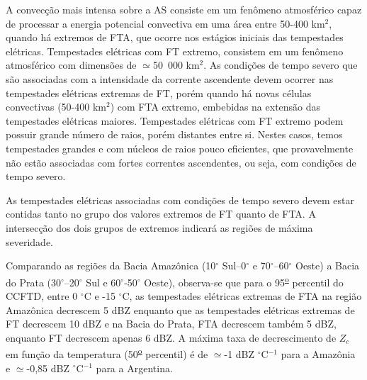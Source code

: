 
A convecção mais intensa sobre a AS consiste em um fenômeno atmosférico capaz de processar a energia potencial convectiva em uma área entre 50-400 km$^{2}$, quando há extremos de FTA, que ocorre nos estágios iniciais das tempestades elétricas. Tempestades elétricas com FT extremo, consistem em um fenômeno  atmosférico com dimensões de $\simeq$50~000 km$^{2}$. As condições de tempo severo que são associadas com a intensidade da corrente ascendente devem ocorrer nas tempestades elétricas extremas de FT, porém quando há novas células convectivas (50-400 km$^{2}$) com FTA extremo, embebidas na extensão das tempestades elétricas maiores. Tempestades elétricas com FT extremo podem possuir grande número de raios, porém distantes entre si. Nestes casos, temos tempestades grandes e com núcleos de raios pouco eficientes, que provavelmente não estão associadas com fortes correntes ascendentes, ou seja, com condições de tempo severo.


As tempestades elétricas associadas com condições de tempo severo devem estar contidas tanto no grupo dos valores extremos de FT quanto de FTA. A intersecção dos dois grupos de extremos indicará as regiões de máxima severidade. %

Comparando as regiões da Bacia Amazônica (10$^{\circ}$ Sul--0$^{\circ}$ e 70$^{\circ}$--60$^{\circ}$ Oeste) a Bacia do Prata (30$^{\circ}$--20$^{\circ}$ Sul e 60$^{\circ}$-50$^{\circ}$ Oeste), observa-se que para o 95\textsuperscript{\underline{o}} percentil do CCFTD, entre 0 $^{\circ}$C e -15 $^{\circ}$C, as tempestades elétricas extremas de FTA na região Amazônica decrescem 5 dBZ enquanto que as tempestades elétricas extremas de FT decrescem 10 dBZ e na Bacia do Prata, FTA decrescem também 5 dBZ, enquanto FT decrescem apenas 6 dBZ. A máxima taxa de decrescimento de $Z_c$ em função da temperatura (50\textsuperscript{\underline{o}} percentil) é de $\simeq$-1 dBZ $^{\circ}$C$^{-1}$ para a Amazônia e $\simeq$-0,85 dBZ $^{\circ}$C$^{-1}$ para a Argentina.


